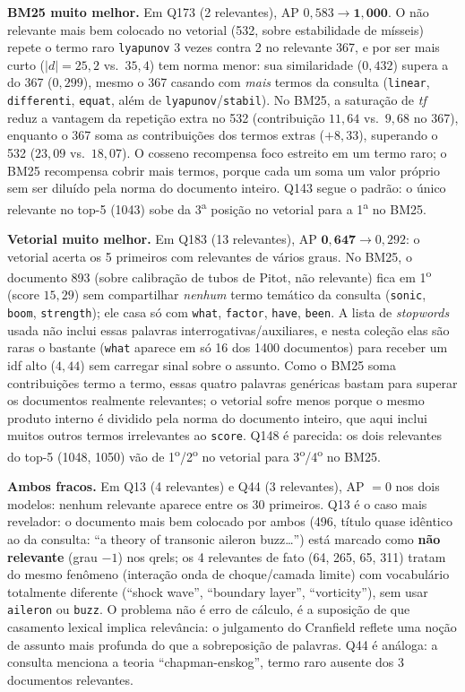 \documentclass[11pt,a4paper]{article}
\newcommand{\code}[1]{\texttt{\footnotesize #1}}
\begin{document}
\textbf{BM25 muito melhor.} Em Q173 (2 relevantes), AP $0{,}583\to\mathbf{1{,}000}$. O não relevante mais
bem colocado no vetorial (532, sobre estabilidade de mísseis) repete o termo raro \code{lyapunov} 3
vezes contra 2 no relevante 367, e por ser mais curto ($|d|{=}25{,}2$ vs.\ $35{,}4$) tem norma menor: sua
similaridade ($0{,}432$) supera a do 367 ($0{,}299$), mesmo o 367 casando com \emph{mais} termos da
consulta (\code{linear}, \code{differenti}, \code{equat}, além de \code{lyapunov}/\code{stabil}). No
BM25, a saturação de \textit{tf} reduz a vantagem da repetição extra no 532 (contribuição $11{,}64$ vs.\
$9{,}68$ no 367), enquanto o 367 soma as contribuições dos termos extras ($+8{,}33$), superando o 532
($23{,}09$ vs.\ $18{,}07$). O cosseno recompensa foco estreito em um termo raro; o BM25 recompensa cobrir
mais termos, porque cada um soma um valor próprio sem ser diluído pela norma do documento inteiro. Q143
segue o padrão: o único relevante no top-5 (1043) sobe da 3\textsuperscript{a} posição no vetorial para
a 1\textsuperscript{a} no BM25.

\textbf{Vetorial muito melhor.} Em Q183 (13 relevantes), AP $\mathbf{0{,}647}\to0{,}292$: o vetorial
acerta os 5 primeiros com relevantes de vários graus. No BM25, o documento 893 (sobre calibração de
tubos de Pitot, não relevante) fica em 1\textsuperscript{o} (score $15{,}29$) sem compartilhar
\emph{nenhum} termo temático da consulta (\code{sonic}, \code{boom}, \code{strength}); ele casa só com
\code{what}, \code{factor}, \code{have}, \code{been}. A lista de \textit{stopwords} usada não inclui
essas palavras interrogativas/auxiliares, e nesta coleção elas são raras o bastante (\code{what}
aparece em só 16 dos 1400 documentos) para receber um idf alto ($4{,}44$) sem carregar sinal sobre o
assunto. Como o BM25 soma contribuições termo a termo, essas quatro palavras genéricas bastam para
superar os documentos realmente relevantes; o vetorial sofre menos porque o mesmo produto interno é
dividido pela norma do documento inteiro, que aqui inclui muitos outros termos irrelevantes ao
\code{score}. Q148 é parecida: os dois relevantes do top-5 (1048, 1050) vão de
1\textsuperscript{o}/2\textsuperscript{o} no vetorial para 3\textsuperscript{o}/4\textsuperscript{o} no
BM25.

\textbf{Ambos fracos.} Em Q13 (4 relevantes) e Q44 (3 relevantes), AP $=0$ nos dois modelos: nenhum
relevante aparece entre os 30 primeiros. Q13 é o caso mais revelador: o documento mais bem colocado por
ambos (496, título quase idêntico ao da consulta: ``a theory of transonic aileron buzz\dots'') está
marcado como \textbf{não relevante} (grau $-1$) nos qrels; os 4 relevantes de fato (64, 265, 65, 311)
tratam do mesmo fenômeno (interação onda de choque/camada limite) com vocabulário totalmente diferente
(``shock wave'', ``boundary layer'', ``vorticity''), sem usar \code{aileron} ou \code{buzz}. O problema
não é erro de cálculo, é a suposição de que casamento lexical implica relevância: o julgamento do
Cranfield reflete uma noção de assunto mais profunda do que a sobreposição de palavras. Q44 é análoga: a
consulta menciona a teoria ``chapman-enskog'', termo raro ausente dos 3 documentos relevantes.
\end{document}

